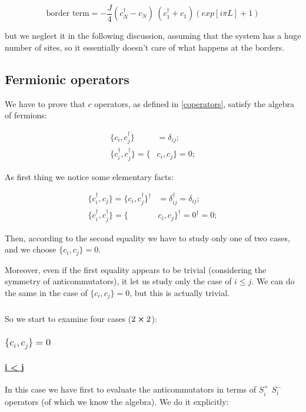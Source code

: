 \documentclass[a4paper,10pt]{article}
\begin{document}
\begin{equation}
\text{border term} = - \frac{J}{4} (c_N^\dagger - c_N)~(c_{1}^\dagger + c_{1})(exp[i \pi L] + 1)
\label{eq:border}
\end{equation}

\noindent but we neglect it in the following discussion, assuming that the system has a huge number of sites, so it essentially doesn't care of what happens at the borders.

\subsection{Fermionic operators}
\label{fermiops}

We have to prove that $c$ operators, as defined in \cref{coperators}, satisfy the algebra of fermions:

\begin{align*}
\{c_i, c_j^\dagger\} &= \delta_{ij};\\
\{c_i^\dagger, c_j^\dagger\} = \{&c_i, c_j\} = 0;
\end{align*}

As first thing we notice some elementary facts:

\begin{align*}
\{c_i^\dagger, c_j\} = \{c_i, c_j^\dagger\}^\dagger &= \delta_{ij}^\dagger = \delta_{ij};\\
\{c_i^\dagger, c_j^\dagger\} = \{&c_i, c_j\}^\dagger = 0^\dagger = 0;
\end{align*}

\noindent Then, according to the second equality we have to study only one of two cases, and we choose $ \{c_i, c_j\} = 0$.

Moreover, even if the first equality appears to be trivial (considering the symmetry of anticommutators), it let us study only the case of $i \leq j$.
We can do the same in the case of $ \{c_i, c_j\} = 0$, but this is actually trivial.

\subparagraph{}So we start to examine four cases ($2 \cross 2$):

\subsubsection{$\{c_i, c_j\} = 0$}

\paragraph{\underline{i < j}} In this case we have first to evaluate the anticommutators in terms of $S_i^+$ $S_i^-$ operators (of which we know the algebra). We do it explicitly:
\end{document}
